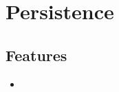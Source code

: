 \section{Persistence}
\label{module:Persistence}

\subsection{Features}
\begin{itemize}
	\item {}
\end{itemize}
\TODO